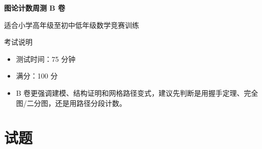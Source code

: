 \documentclass[11pt,a4paper,fontset=fandol]{ctexart}
\begin{document}
\thispagestyle{empty}
\begin{center}
{\fontsize{22}{28}\selectfont\bfseries 图论计数周测 B 卷\par}
\vspace{0.4cm}
{\large 适合小学高年级至初中低年级数学竞赛训练\par}
\end{center}

\begin{infobox}{考试说明}
\begin{itemize}
  \item 测试时间：75 分钟
  \item 满分：100 分
  \item B 卷更强调建模、结构证明和网格路径变式，建议先判断是用握手定理、完全图/二分图，还是用路径分段计数。
\end{itemize}
\end{infobox}

\section{试题}
\end{document}
